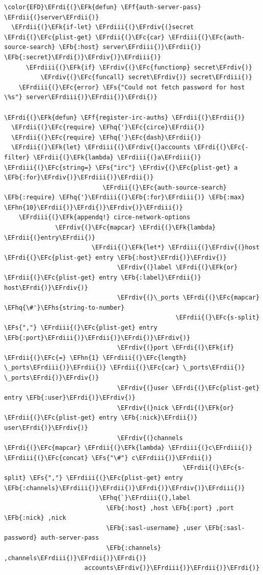 \documentclass{scrartcl}
\newcommand{\EFk}[1]{\textcolor{EFk}{#1}} %
\newcommand{\EFs}[1]{\textcolor{EFs}{#1}} %
\newcommand{\EFb}[1]{\textcolor{EFb}{#1}} %
\newcommand{\EFc}[1]{\textcolor{EFc}{#1}} %
\newcommand{\EFf}[1]{\textcolor{EFf}{#1}} %
\newcommand{\EFhn}[1]{#1} %
\newcommand{\EFhq}[1]{#1} %
\newcommand{\EFhs}[1]{#1} %
\newcommand{\EFrdi}[1]{#1} %
\newcommand{\EFrdii}[1]{#1} %
\newcommand{\EFrdiii}[1]{#1} %
\newcommand{\EFrdiv}[1]{#1} %
\begin{document}
\begin{Code}
\begin{Verbatim}[]
\color{EFD}\EFrdi{(}\EFk{defun} \EFf{auth-server-pass} \EFrdii{(}server\EFrdii{)}
  \EFrdii{(}\EFk{if-let} \EFrdiii{(}\EFrdiv{(}secret \EFrdi{(}\EFc{plist-get} \EFrdii{(}\EFc{car} \EFrdiii{(}\EFc{auth-source-search} \EFb{:host} server\EFrdiii{)}\EFrdii{)} \EFb{:secret}\EFrdi{)}\EFrdiv{)}\EFrdiii{)}
      \EFrdiii{(}\EFk{if} \EFrdiv{(}\EFc{functionp} secret\EFrdiv{)}
          \EFrdiv{(}\EFc{funcall} secret\EFrdiv{)} secret\EFrdiii{)}
    \EFrdiii{(}\EFc{error} \EFs{"Could not fetch password for host \%s"} server\EFrdiii{)}\EFrdii{)}\EFrdi{)}

\EFrdi{(}\EFk{defun} \EFf{register-irc-auths} \EFrdii{(}\EFrdii{)}
  \EFrdii{(}\EFc{require} \EFhq{'}\EFc{circe}\EFrdii{)}
  \EFrdii{(}\EFc{require} \EFhq{'}\EFc{dash}\EFrdii{)}
  \EFrdii{(}\EFk{let} \EFrdiii{(}\EFrdiv{(}accounts \EFrdi{(}\EFc{-filter} \EFrdii{(}\EFk{lambda} \EFrdiii{(}a\EFrdiii{)} \EFrdiii{(}\EFc{string=} \EFs{"irc"} \EFrdiv{(}\EFc{plist-get} a \EFb{:for}\EFrdiv{)}\EFrdiii{)}\EFrdii{)}
                           \EFrdii{(}\EFc{auth-source-search} \EFb{:require} \EFhq{'}\EFrdiii{(}\EFb{:for}\EFrdiii{)} \EFb{:max} \EFhn{10}\EFrdii{)}\EFrdi{)}\EFrdiv{)}\EFrdiii{)}
    \EFrdiii{(}\EFk{appendq!} circe-network-options
              \EFrdiv{(}\EFc{mapcar} \EFrdi{(}\EFk{lambda} \EFrdii{(}entry\EFrdii{)}
                        \EFrdii{(}\EFk{let*} \EFrdiii{(}\EFrdiv{(}host \EFrdi{(}\EFc{plist-get} entry \EFb{:host}\EFrdi{)}\EFrdiv{)}
                               \EFrdiv{(}label \EFrdi{(}\EFk{or} \EFrdii{(}\EFc{plist-get} entry \EFb{:label}\EFrdii{)} host\EFrdi{)}\EFrdiv{)}
                               \EFrdiv{(}\_ports \EFrdi{(}\EFc{mapcar} \EFhq{\#'}\EFhs{string-to-number}
                                               \EFrdii{(}\EFc{s-split} \EFs{","} \EFrdiii{(}\EFc{plist-get} entry \EFb{:port}\EFrdiii{)}\EFrdii{)}\EFrdi{)}\EFrdiv{)}
                               \EFrdiv{(}port \EFrdi{(}\EFk{if} \EFrdii{(}\EFc{=} \EFhn{1} \EFrdiii{(}\EFc{length} \_ports\EFrdiii{)}\EFrdii{)} \EFrdii{(}\EFc{car} \_ports\EFrdii{)} \_ports\EFrdi{)}\EFrdiv{)}
                               \EFrdiv{(}user \EFrdi{(}\EFc{plist-get} entry \EFb{:user}\EFrdi{)}\EFrdiv{)}
                               \EFrdiv{(}nick \EFrdi{(}\EFk{or} \EFrdii{(}\EFc{plist-get} entry \EFb{:nick}\EFrdii{)} user\EFrdi{)}\EFrdiv{)}
                               \EFrdiv{(}channels \EFrdi{(}\EFc{mapcar} \EFrdii{(}\EFk{lambda} \EFrdiii{(}c\EFrdiii{)} \EFrdiii{(}\EFc{concat} \EFs{"\#"} c\EFrdiii{)}\EFrdii{)}
                                                 \EFrdii{(}\EFc{s-split} \EFs{","} \EFrdiii{(}\EFc{plist-get} entry \EFb{:channels}\EFrdiii{)}\EFrdii{)}\EFrdi{)}\EFrdiv{)}\EFrdiii{)}
                          \EFhq{`}\EFrdiii{(},label
                            \EFb{:host} ,host \EFb{:port} ,port \EFb{:nick} ,nick
                            \EFb{:sasl-username} ,user \EFb{:sasl-password} auth-server-pass
                            \EFb{:channels} ,channels\EFrdiii{)}\EFrdii{)}\EFrdi{)}
                      accounts\EFrdiv{)}\EFrdiii{)}\EFrdii{)}\EFrdi{)}
\end{Verbatim}
\end{Code}
\end{document}
